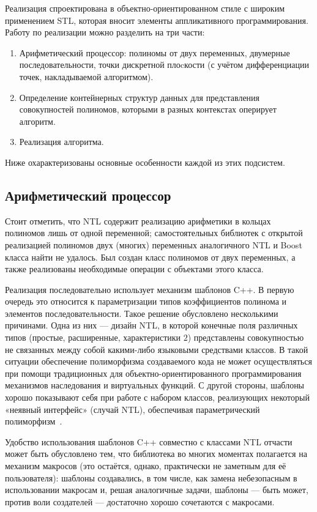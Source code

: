 \documentclass[14pt]{extarticle}
\begin{document}
Реализация спроектирована в объектно-ориентированном стиле с широким применением
STL, которая вносит элементы аппликативного программирования. Работу по
реализации можно разделить на три части:
\renewcommand{\theenumii}{\arabic{enumii}}
\renewcommand{\labelenumi}{\theenumi.}
\begin{enumerate}
    \item Арифметический процессор: полиномы от двух переменных, двумерные
    последовательности, точки дискретной плоcкости (с учётом дифференциации
    точек, накладываемой алгоритмом).
    \item Определение контейнерных структур данных для представления
    совокупностей полиномов, которыми в разных контекстах оперирует алгоритм.
    \item Реализация алгоритма.
\end{enumerate}
Ниже охарактеризованы основные особенности каждой из этих подсистем.

\subsection{Арифметический процессор}
\label{Arithmetics}

Стоит отметить, что NTL содержит реализацию арифметики в кольцах полиномов лишь
от одной переменной; самостоятельных библиотек с открытой реализацией
полиномов двух (многих) переменных аналогичного NTL и Boost класса найти не
удалось. Был создан класс полиномов от двух переменных, а также реализованы
необходимые операции с объектами этого класса.

Реализация последовательно использует механизм шаблонов C++. В первую очередь
это относится к параметризации типов коэффициентов полинома и элементов
последовательности. Такое решение обусловлено
несколькими причинами. Одна из них — дизайн NTL, в которой конечные поля
различных типов (простые, расширенные, характеристики $2$)
представлены совокупностью не связанных между собой какими-либо языковыми
средствами классов. В такой ситуации обеспечение полиморфизма создаваемого кода
не может осуществляться при помощи традиционных для
объектно-ори\-ен\-ти\-ро\-ван\-но\-го программирования механизмов наследования и
виртуальных
функций. С другой стороны, шаблоны хорошо показывают себя при работе с
набором классов, реализующих некоторый «неявный интерфейс» (случай NTL),
обеспечивая параметрический полиморфизм~\cite{C++Templates}.

Удобство использования шаблонов C++ совместно с классами NTL
отчасти может быть обусловлено тем, что библиотека во многих моментах
полагается на механизм
макросов (это остаётся, однако, практически не заметным для её пользователя):
шаблоны создавались, в том числе, как замена небезопасным в использовании
макросам и, решая аналогичные задачи, шаблоны — быть может, против воли
создателей — достаточно хорошо сочетаются с макросами.
\end{document}
